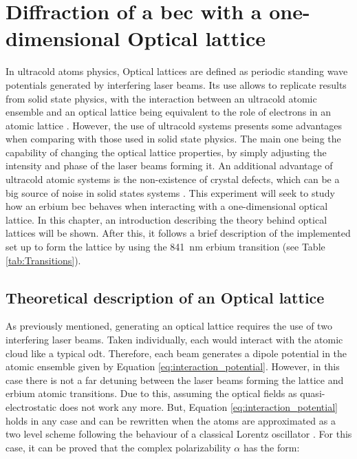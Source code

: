 
\chapter{Diffraction of a \acl{bec} with a one-dimensional Optical lattice}
\label{chap:one_dimensional_lattices}
In ultracold atoms physics, Optical lattices are defined as periodic standing wave potentials generated by interfering laser beams. Its use allows to replicate results from solid state physics, with the interaction between an ultracold atomic ensemble and an optical lattice being equivalent to the role of electrons in an atomic lattice \cite{Lewenstein2007, Bloch2008}.  However, the use of ultracold systems presents some advantages when comparing with those used in solid state physics. The main one being the capability of changing the optical lattice properties, by simply adjusting the intensity and phase of the laser beams forming it. An additional advantage of ultracold atomic systems is the non-existence of crystal defects, which can be a big source of noise in solid states systems \cite{VanDerZiel1978}. This experiment will seek to study how an erbium \ac{bec} behaves when interacting with a one-dimensional optical lattice. In this chapter, an introduction describing the theory behind optical lattices will be shown. After this, it follows a brief description of the implemented set up to form the lattice by using the \SI{841}{\nano\meter} erbium transition (see Table \ref{tab:Transitions}).

\section{Theoretical description of an Optical lattice}

As previously mentioned, generating an optical lattice requires the use of two interfering laser beams. Taken individually, each would interact with the atomic cloud like a typical \acf{odt}. Therefore, each beam generates a dipole potential in the atomic ensemble given by Equation \eqref{eq:interaction_potential}. However, in this case there is not a far detuning between the laser beams forming the lattice and erbium atomic transitions. Due to this, assuming the optical fields as quasi-electrostatic does not work any more. But, Equation \eqref{eq:interaction_potential} holds in any case and can be rewritten when the atoms are approximated as a two level scheme following the behaviour of a classical Lorentz oscillator \cite{Grimm2000}. For this case, it can be proved that the complex polarizability $\alpha$ has the form:

